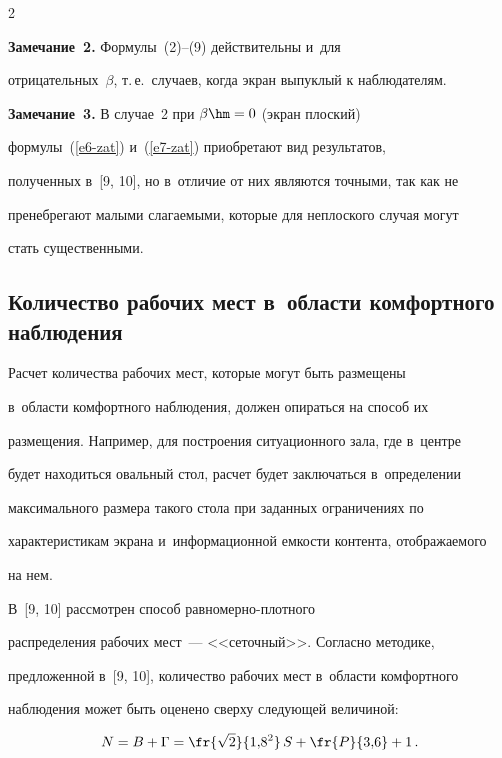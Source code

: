 \begin{multicols}{2}
\noindent

\textbf{Замечание~2.} Формулы~(2)--(9) действительны и~для

отрицательных~$\beta$, т.\,е.\ случаев, когда экран выпуклый к наблюдателям.



\smallskip



\noindent

\textbf{Замечание~3.} В случае~2 при $\beta\hm=0$ (экран плоский)

формулы~(\ref{e6-zat}) и~(\ref{e7-zat}) приобретают вид результатов,

полученных в~[9, 10], но в~отличие от них являются точными, так как не

пренебрегают малыми сла\-га\-емы\-ми, которые для неплоского случая могут

стать существенными.



\subsection{Количество рабочих мест в~области комфортного наблюдения}



    Расчет количества рабочих мест, которые могут быть размещены

в~области комфортного наблюдения, должен опираться на способ их

размещения. Например, для построения ситуационного зала, где в~центре

будет находиться овальный стол, расчет будет заключаться в~определении

максимального размера такого стола при заданных ограничениях по

характеристикам экрана и~информационной емкости контента, отображаемого

на нем.

%

В~[9, 10] рассмотрен способ рав\-но\-мер\-но-плот\-но\-го

распределения рабочих мест~--- <<сеточный>>. Согласно методике,

предложенной в~[9, 10], количество рабочих мест в~области комфортного

наблюдения может быть оценено сверху следующей величиной:

    \begin{equation}

    N=B+\Gamma =\fr{\sqrt{2}}{1{,}8^2}\,S+\fr{P}{3{,}6} +1\,.


\end{equation}
\end{multicols}

